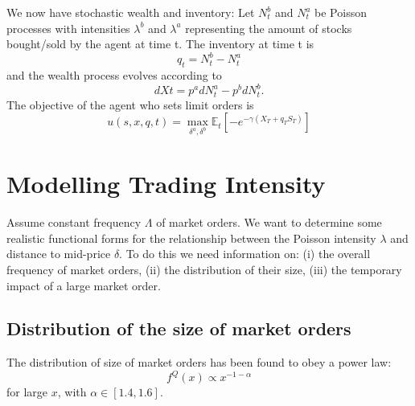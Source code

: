 We now have stochastic wealth and inventory: Let $N^b_t$ and $N^a_t$ be Poisson processes with intensities $\lambda^b$ and $\lambda^a$ representing the amount of stocks bought/sold by the agent at time t. The inventory at time t is 
$$q_t=N^b_t-N^a_t$$ and the wealth process evolves according to
$$dXt=p^adN^a_t-p^bdN^b_t.$$
The objective of the agent who sets limit orders is 
$$u(s,x,q,t)=\max\limits_{\delta^a,\delta^b}\mathbb{E}_t\left[-e^{-\gamma(X_T+q_TS_T)}\right]$$

\section{Modelling Trading Intensity}\label{sec:3.6}
Assume constant frequency $\Lambda$ of market orders. We want to determine some realistic functional forms for the relationship between the Poisson intensity $\lambda$ and distance to mid-price $\delta$. 
To do this we need information on: (i) the overall frequency of market orders, (ii) the distribution of their size, (iii) the temporary impact of a large market order. 
\subsection*{Distribution of the size of market orders}
The distribution of size of market orders has been found to obey a power law:
\begin{equation}\label{eq:2}
    f^{Q}(x)\propto x^{-1-\alpha}
\end{equation}
for large $x$, with $\alpha\in[1.4,1.6].$
